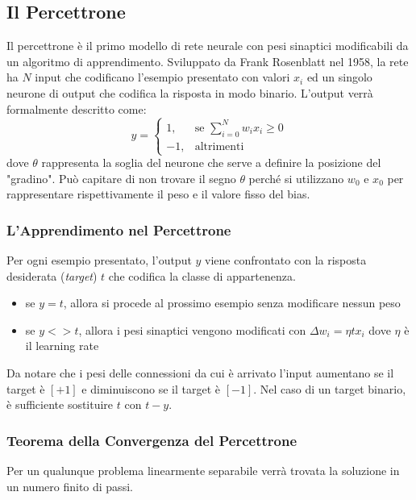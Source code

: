 \subsection{Il Percettrone}
Il percettrone è il primo modello di rete neurale con pesi sinaptici modificabili da un algoritmo di apprendimento. Sviluppato da Frank Rosenblatt nel 1958, la rete ha \(N\) input che codificano l'esempio presentato con valori \(x_i\) ed un singolo neurone di output che codifica la risposta in modo binario. 
L'output verrà formalmente descritto come:
\[
    y = 
    \begin{cases} 
        1, & \mbox{se } \sum^N_{i=0}w_ix_i \geq 0 \\
        -1, & \mbox{altrimenti}
    \end{cases}
\]
dove \(\theta\) rappresenta la soglia del neurone che serve a definire la posizione del "gradino". Può capitare di non trovare il segno \(\theta\) perché si utilizzano \(w_0\) e \(x_0\) per rappresentare rispettivamente il peso e il valore fisso del bias.

\subsubsection{L'Apprendimento nel Percettrone}
Per ogni esempio presentato, l'output \(y\) viene confrontato con la risposta desiderata (\textit{target}) \(t\) che codifica la classe di appartenenza.
\begin{itemize}
    \item se \(y=t\), allora si procede al prossimo esempio senza modificare nessun peso
    \item se \(y<>t\), allora i pesi sinaptici vengono modificati con \(\Delta w_i=\eta tx_i\) dove \(\eta\) è il learning rate 
\end{itemize}

Da notare che i pesi delle connessioni da cui è arrivato l'input aumentano se il target è \([+1]\) e diminuiscono se il target è \([-1]\). Nel caso di un target binario, è sufficiente sostituire \(t\) con \(t-y\).\\

\subsubsection{Teorema della Convergenza del Percettrone}
Per un qualunque problema linearmente separabile verrà trovata la soluzione in un numero finito di passi.

